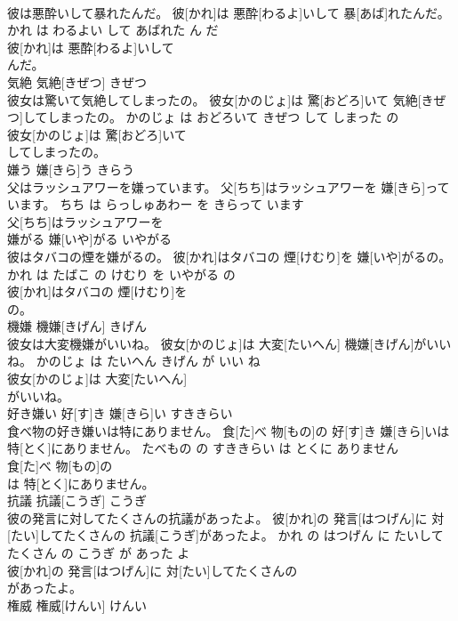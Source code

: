 \documentclass[8pt]{extreport}
\begin{document}
\begin{CJK}{UTF8}{min}
\\	彼は悪酔いして暴れたんだ。	彼[かれ]は 悪酔[わるよ]いして 暴[あば]れたんだ。	かれ は わるよい して あばれた ん だ	
\\	彼[かれ]は 悪酔[わるよ]いして
\\	んだ。			
\\	気絶	気絶[きぜつ]	きぜつ	
\\	彼女は驚いて気絶してしまったの。	彼女[かのじょ]は 驚[おどろ]いて 気絶[きぜつ]してしまったの。	かのじょ は おどろいて きぜつ して しまった の	
\\	彼女[かのじょ]は 驚[おどろ]いて
\\	してしまったの。			
\\	嫌う	嫌[きら]う	きらう	
\\	父はラッシュアワーを嫌っています。	父[ちち]はラッシュアワーを 嫌[きら]っています。	ちち は らっしゅあわー を きらって います	
\\	父[ちち]はラッシュアワーを
\\	嫌がる	嫌[いや]がる	いやがる	
\\	彼はタバコの煙を嫌がるの。	彼[かれ]はタバコの 煙[けむり]を 嫌[いや]がるの。	かれ は たばこ の けむり を いやがる の	
\\	彼[かれ]はタバコの 煙[けむり]を
\\	の。			
\\	機嫌	機嫌[きげん]	きげん	
\\	彼女は大変機嫌がいいね。	彼女[かのじょ]は 大変[たいへん] 機嫌[きげん]がいいね。	かのじょ は たいへん きげん が いい ね	
\\	彼女[かのじょ]は 大変[たいへん]
\\	がいいね。			
\\	好き嫌い	好[す]き 嫌[きら]い	すききらい	
\\	食べ物の好き嫌いは特にありません。	食[た]べ 物[もの]の 好[す]き 嫌[きら]いは 特[とく]にありません。	たべもの の すききらい は とくに ありません	
\\	食[た]べ 物[もの]の
\\	は 特[とく]にありません。			
\\	抗議	抗議[こうぎ]	こうぎ	
\\	彼の発言に対してたくさんの抗議があったよ。	彼[かれ]の 発言[はつげん]に 対[たい]してたくさんの 抗議[こうぎ]があったよ。	かれ の はつげん に たいして たくさん の こうぎ が あった よ	
\\	彼[かれ]の 発言[はつげん]に 対[たい]してたくさんの
\\	があったよ。			
\\	権威	権威[けんい]	けんい	

\end{CJK}
\end{document}
